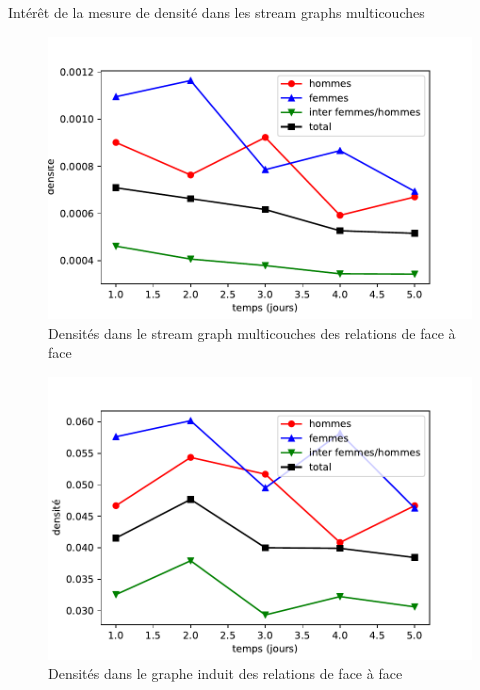 \documentclass[15pt]{beamer}
\def \stgm {stream graph multicouches}
\def \stgms {stream graphs multicouches}
\begin{document}
\begin{frame}{Intérêt de la mesure de densité dans les \stgms{}}
    \begin{minipage}{0.45\textwidth}
        \begin{figure}
            \centering
            \includegraphics[width=\textwidth]{img/compfg.pdf}
            \caption{Densités dans le \stgm{} des relations de face à face}
            \label{fig:my_label}
        \end{figure}
    \end{minipage}
    \begin{minipage}{0.45\textwidth}
        \begin{figure}
            \centering
            \includegraphics[width=\textwidth]{img/densitesj.pdf}
            \caption{Densités dans le graphe induit des relations de face à face}
            \label{fig:my_label}
        \end{figure}
    \end{minipage}
\end{frame}
\end{document}
